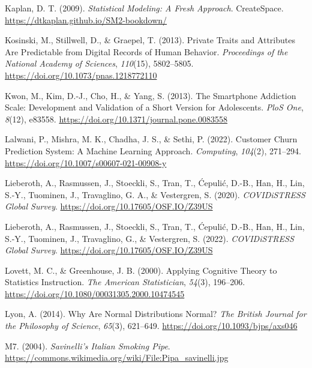 \documentclass[
  letterpaper,
  twoside,
  open=any]{scrbook}
\newlength{\cslhangindent}
\newenvironment{CSLReferences}[2] %
 {\begin{list}{}{%
  \setlength{\itemindent}{0pt}
  \setlength{\leftmargin}{0pt}
  \setlength{\parsep}{0pt}
  \ifodd #1
   \setlength{\leftmargin}{\cslhangindent}
   \setlength{\itemindent}{-1\cslhangindent}
  \fi
  \setlength{\itemsep}{#2\baselineskip}}}
 {\end{list}}
\theoremstyle{definition}
\theoremstyle{definition}
\theoremstyle{definition}
\theoremstyle{remark}
\begin{document}
\begin{CSLReferences}{1}{0}
Kaplan, D. T. (2009). \emph{Statistical Modeling: A Fresh Approach}.
CreateSpace. \url{https://dtkaplan.github.io/SM2-bookdown/}

Kosinski, M., Stillwell, D., \& Graepel, T. (2013). Private Traits and
Attributes Are Predictable from Digital Records of Human Behavior.
\emph{Proceedings of the National Academy of Sciences}, \emph{110}(15),
5802--5805. \url{https://doi.org/10.1073/pnas.1218772110}

Kwon, M., Kim, D.-J., Cho, H., \& Yang, S. (2013). The Smartphone
Addiction Scale: Development and Validation of a Short Version for
Adolescents. \emph{PloS One}, \emph{8}(12), e83558.
\url{https://doi.org/10.1371/journal.pone.0083558}

Lalwani, P., Mishra, M. K., Chadha, J. S., \& Sethi, P. (2022). Customer
Churn Prediction System: A Machine Learning Approach. \emph{Computing},
\emph{104}(2), 271--294.
\url{https://doi.org/10.1007/s00607-021-00908-y}

Lieberoth, A., Rasmussen, J., Stoeckli, S., Tran, T., Ćepulić, D.-B.,
Han, H., Lin, S.-Y., Tuominen, J., Travaglino, G. A., \& Vestergren, S.
(2020). \emph{{COVIDiSTRESS} Global Survey}.
\url{https://doi.org/10.17605/OSF.IO/Z39US}

Lieberoth, A., Rasmussen, J., Stoeckli, S., Tran, T., Ćepulić, D.-B.,
Han, H., Lin, S.-Y., Tuominen, J., Travaglino, G., \& Vestergren, S.
(2022). \emph{{COVIDiSTRESS} Global Survey}.
\url{https://doi.org/10.17605/OSF.IO/Z39US}

Lovett, M. C., \& Greenhouse, J. B. (2000). Applying {Cognitive Theory}
to {Statistics Instruction}. \emph{The American Statistician},
\emph{54}(3), 196--206.
\url{https://doi.org/10.1080/00031305.2000.10474545}

Lyon, A. (2014). Why Are {Normal Distributions Normal}? \emph{The
British Journal for the Philosophy of Science}, \emph{65}(3), 621--649.
\url{https://doi.org/10.1093/bjps/axs046}

M7. (2004). \emph{Savinelli's {Italian} Smoking Pipe}.
\url{https://commons.wikimedia.org/wiki/File:Pipa_savinelli.jpg}


\end{CSLReferences}
\end{document}
